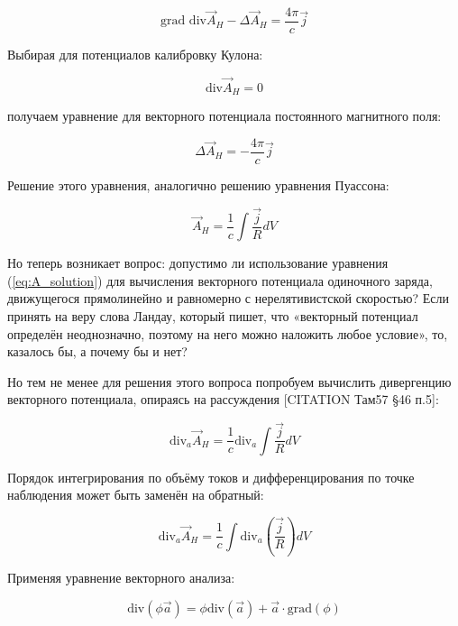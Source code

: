 \documentclass[12pt, a4paper]{article}
\begin{document}
\begin{equation}
\text{grad div} \vec{A}_H - \Delta \vec{A}_H = \frac{4\pi}{c} \vec{j}
\label{eq:vector_identity}
\end{equation}

Выбирая для потенциалов калибровку Кулона:

\begin{equation}
\text{div} \vec{A}_H = 0
\label{eq:coulomb_gauge}
\end{equation}

получаем уравнение для векторного потенциала постоянного магнитного поля:

\begin{equation}
\Delta \vec{A}_H = -\frac{4\pi}{c} \vec{j}
\label{eq:poisson_A}
\end{equation}

Решение этого уравнения, аналогично решению уравнения Пуассона:

\begin{equation}
\vec{A}_H = \frac{1}{c} \int \frac{\vec{j}}{R} dV
\label{eq:A_solution}
\end{equation}

Но теперь возникает вопрос: допустимо ли использование уравнения (\ref{eq:A_solution}) для вычисления векторного потенциала одиночного заряда, движущегося прямолинейно и равномерно с нерелятивистской скоростью? Если принять на веру слова Ландау, который пишет, что «векторный потенциал определён неоднозначно, поэтому на него можно наложить любое условие», то, казалось бы, а почему бы и нет?

Но тем не менее для решения этого вопроса попробуем вычислить дивергенцию векторного потенциала, опираясь на рассуждения [CITATION Там57 §46 п.5]:

\begin{equation}
\text{div}_a \vec{A}_H = \frac{1}{c} \text{div}_a \int \frac{\vec{j}}{R} dV
\label{eq:div_A_start}
\end{equation}

Порядок интегрирования по объёму токов и дифференцирования по точке наблюдения может быть заменён на обратный:

\begin{equation}
\text{div}_a \vec{A}_H = \frac{1}{c} \int \text{div}_a \left( \frac{\vec{j}}{R} \right) dV
\label{eq:div_A_swap}
\end{equation}

Применяя уравнение векторного анализа:

\begin{equation}
\text{div}(\phi \vec{a}) = \phi \text{div}(\vec{a}) + \vec{a} \cdot \text{grad}(\phi)
\label{eq:vector_div_identity}
\end{equation}
\end{document}
